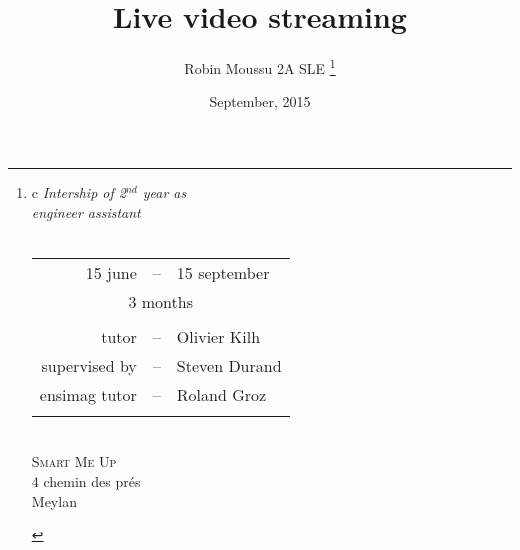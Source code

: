\documentclass[a4paper,11pt]{custom}
\newcommand{\smu}{\textsc{Smart Me Up}}
\begin{document}



\title{
  Live video streaming
}
\author{
  Robin Moussu 2A SLE
  \thanks{
  \begin{tabular}{c}
    \textit{Intership of 2$^{nd}$ year as}\\
    \textit{engineer assistant}\\
    \vspace{2em}\\
    \begin{tabular}{rcl}
      15 june &--& 15 september\\
      \multicolumn{3}{c}{3 months}\\
      \\
      tutor &--& Olivier Kilh \\
      supervised by &--& Steven Durand \\
      ensimag tutor &--& Roland Groz\\
      \\
    \end{tabular}
    \vspace{2em}\\
    \smu\\
    4 chemin des prés\\
    Meylan\\
  \end{tabular}
  }
}
\date{
  September, 2015
}
\maketitle

\end{document}
